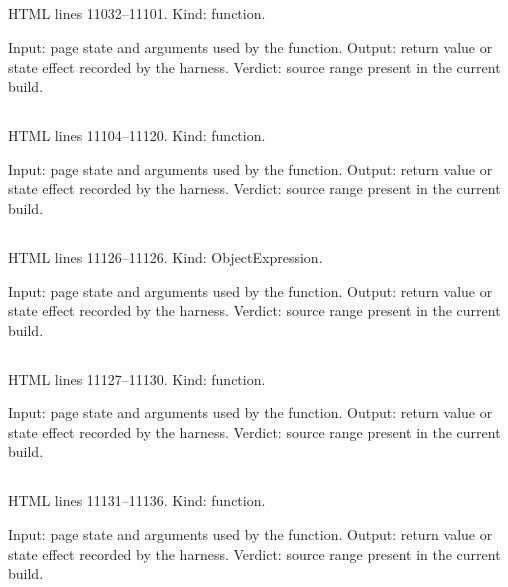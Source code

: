 \subsection*{\texttt{}}
\label{vf_602_pdfDoc}
HTML lines 11032--11101. Kind: function.

Input: page state and arguments used by the function.
Output: return value or state effect recorded by the harness.
Verdict: source range present in the current build.

\subsection*{\texttt{}}
\label{vf_603_svgToJpeg}
HTML lines 11104--11120. Kind: function.

Input: page state and arguments used by the function.
Output: return value or state effect recorded by the harness.
Verdict: source range present in the current build.

\subsection*{\texttt{}}
\label{vf_604_SEL_STATE}
HTML lines 11126--11126. Kind: ObjectExpression.

Input: page state and arguments used by the function.
Output: return value or state effect recorded by the harness.
Verdict: source range present in the current build.

\subsection*{\texttt{}}
\label{vf_605_selRunIndex}
HTML lines 11127--11130. Kind: function.

Input: page state and arguments used by the function.
Output: return value or state effect recorded by the harness.
Verdict: source range present in the current build.

\subsection*{\texttt{}}
\label{vf_606_selGraphContext}
HTML lines 11131--11136. Kind: function.

Input: page state and arguments used by the function.
Output: return value or state effect recorded by the harness.
Verdict: source range present in the current build.

